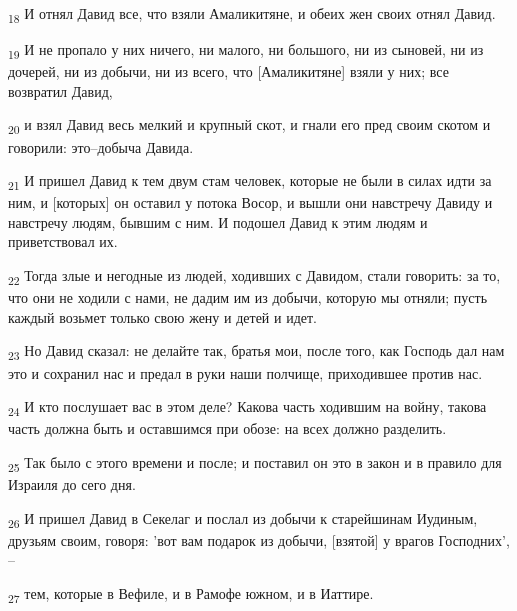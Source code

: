 \begin{tcolorbox}
\textsubscript{18} И отнял Давид все, что взяли Амаликитяне, и обеих жен своих отнял Давид.
\end{tcolorbox}
\begin{tcolorbox}
\textsubscript{19} И не пропало у них ничего, ни малого, ни большого, ни из сыновей, ни из дочерей, ни из добычи, ни из всего, что [Амаликитяне] взяли у них; все возвратил Давид,
\end{tcolorbox}
\begin{tcolorbox}
\textsubscript{20} и взял Давид весь мелкий и крупный скот, и гнали его пред своим скотом и говорили: это--добыча Давида.
\end{tcolorbox}
\begin{tcolorbox}
\textsubscript{21} И пришел Давид к тем двум стам человек, которые не были в силах идти за ним, и [которых] он оставил у потока Восор, и вышли они навстречу Давиду и навстречу людям, бывшим с ним. И подошел Давид к этим людям и приветствовал их.
\end{tcolorbox}
\begin{tcolorbox}
\textsubscript{22} Тогда злые и негодные из людей, ходивших с Давидом, стали говорить: за то, что они не ходили с нами, не дадим им из добычи, которую мы отняли; пусть каждый возьмет только свою жену и детей и идет.
\end{tcolorbox}
\begin{tcolorbox}
\textsubscript{23} Но Давид сказал: не делайте так, братья мои, после того, как Господь дал нам это и сохранил нас и предал в руки наши полчище, приходившее против нас.
\end{tcolorbox}
\begin{tcolorbox}
\textsubscript{24} И кто послушает вас в этом деле? Какова часть ходившим на войну, такова часть должна быть и оставшимся при обозе: на всех должно разделить.
\end{tcolorbox}
\begin{tcolorbox}
\textsubscript{25} Так было с этого времени и после; и поставил он это в закон и в правило для Израиля до сего дня.
\end{tcolorbox}
\begin{tcolorbox}
\textsubscript{26} И пришел Давид в Секелаг и послал из добычи к старейшинам Иудиным, друзьям своим, говоря: 'вот вам подарок из добычи, [взятой] у врагов Господних', --
\end{tcolorbox}
\begin{tcolorbox}
\textsubscript{27} тем, которые в Вефиле, и в Рамофе южном, и в Иаттире.
\end{tcolorbox}
